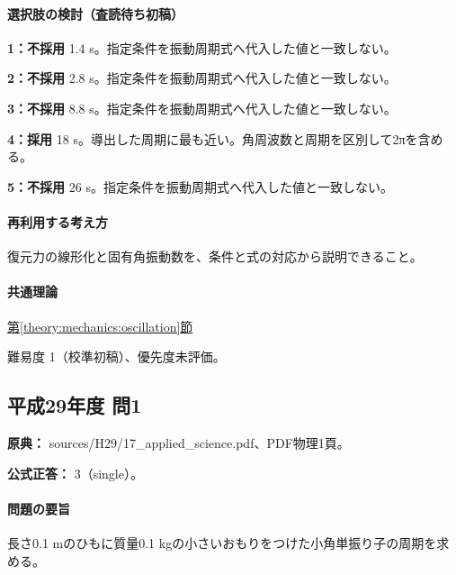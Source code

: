 \paragraph{選択肢の検討（査読待ち初稿）}\mbox{}\par

\noindent\textbf{1：不採用} 1.4 s。指定条件を振動周期式へ代入した値と一致しない。\par

\noindent\textbf{2：不採用} 2.8 s。指定条件を振動周期式へ代入した値と一致しない。\par

\noindent\textbf{3：不採用} 8.8 s。指定条件を振動周期式へ代入した値と一致しない。\par

\noindent\textbf{4：採用} 18 s。導出した周期に最も近い。角周波数と周期を区別して2πを含める。\par

\noindent\textbf{5：不採用} 26 s。指定条件を振動周期式へ代入した値と一致しない。\par

\paragraph{再利用する考え方} 復元力の線形化と固有角振動数を、条件と式の対応から説明できること。

\paragraph{共通理論} \hyperref[theory:mechanics:oscillation]{第\ref*{theory:mechanics:oscillation}節}

\par 難易度 1（校準初稿）、優先度未評価。

\subsection{平成29年度 問1}
\label{q:h29-reg-applied-01}

\noindent\textbf{原典：} sources/H29/17\_applied\_science.pdf、PDF物理1頁。

\textbf{公式正答：} 3（single）。

\paragraph{問題の要旨} 長さ0.1 mのひもに質量0.1 kgの小さいおもりをつけた小角単振り子の周期を求める。


